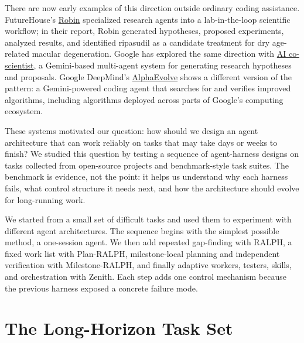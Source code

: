 \documentclass[11pt,a4paper]{article}
\newcommand{\code}[1]{#1}
\begin{document}
There are now early examples of this direction outside ordinary coding assistance. FutureHouse's \href{https://www.futurehouse.org/research-announcements/demonstrating-end-to-end-scientific-discovery-with-robin-a-multi-agent-system}{Robin} specialized research agents into a lab-in-the-loop scientific workflow; in their report, Robin generated hypotheses, proposed experiments, analyzed results, and identified \code{ripasudil} as a candidate treatment for dry age-related macular degeneration. Google has explored the same direction with \href{https://research.google/blog/accelerating-scientific-breakthroughs-with-an-ai-co-scientist}{AI co-scientist}, a Gemini-based multi-agent system for generating research hypotheses and proposals. Google DeepMind's \href{https://deepmind.google/blog/alphaevolve-a-gemini-powered-coding-agent-for-designing-advanced-algorithms/}{AlphaEvolve} shows a different version of the pattern: a Gemini-powered coding agent that searches for and verifies improved algorithms, including algorithms deployed across parts of Google's computing ecosystem.

These systems motivated our question: how should we design an agent architecture that can work reliably on tasks that may take days or weeks to finish? We studied this question by testing a sequence of agent-harness designs on tasks collected from open-source projects and benchmark-style task suites. The benchmark is evidence, not the point: it helps us understand why each harness fails, what control structure it needs next, and how the architecture should evolve for long-running work.

We started from a small set of difficult tasks and used them to experiment with different agent architectures. The sequence begins with the simplest possible method, a one-session agent. We then add repeated gap-finding with \code{RALPH}, a fixed work list with \code{Plan-RALPH}, milestone-local planning and independent verification with \code{Milestone-RALPH}, and finally adaptive workers, testers, skills, and orchestration with \code{Zenith}. Each step adds one control mechanism because the previous harness exposed a concrete failure mode.

\section{The Long-Horizon Task Set}
\end{document}
